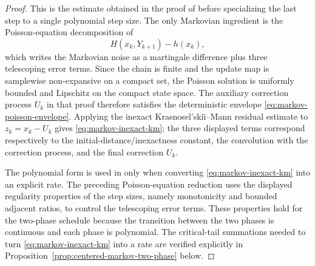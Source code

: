 \documentclass{article}
\begin{document}
\begin{proof}
This is the estimate obtained in the proof of \citet[Theorem~3.1]{blaser2026asymptotic} before specializing the last step to a single polynomial step size. The only Markovian ingredient is the Poisson-equation decomposition of
\begin{equation}
H(x_k,Y_{k+1})-h(x_k),
\end{equation}
which writes the Markovian noise as a martingale difference plus three telescoping error terms. Since the chain is finite and the update map is samplewise non-expansive on a compact set, the Poisson solution is uniformly bounded and Lipschitz on the compact state space. The auxiliary correction process $U_k$ in that proof therefore satisfies the deterministic envelope \eqref{eq:markov-poisson-envelope}. Applying the inexact Krasnosel'ski\u{\i}--Mann residual estimate to $z_k=x_k-U_k$ gives \eqref{eq:markov-inexact-km}; the three displayed terms correspond respectively to the initial-distance/inexactness constant, the convolution with the correction process, and the final correction $U_k$.

The polynomial form is used in \citet{blaser2026asymptotic} only when converting \eqref{eq:markov-inexact-km} into an explicit rate. The preceding Poisson-equation reduction uses the displayed regularity properties of the step sizes, namely monotonicity and bounded adjacent ratios, to control the telescoping error terms. These properties hold for the two-phase schedule because the transition between the two phases is continuous and each phase is polynomial. The critical-tail summations needed to turn \eqref{eq:markov-inexact-km} into a rate are verified explicitly in Proposition~\ref{prop:centered-markov-two-phase} below.
\end{proof}
\end{document}
